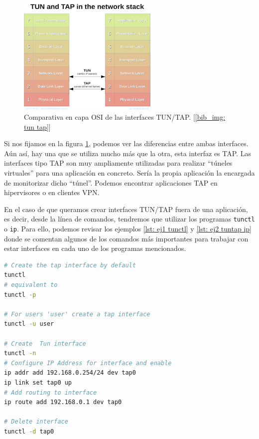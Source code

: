 \documentclass[12pt]{article}
\begin{document}
	\begin{figure}[h!]
		\begin{center}
			\includegraphics[width=0.6\textwidth]{img/tun_vs_tap.png}
			\caption{Comparativa en capa OSI de las interfaces TUN/TAP. [\ref{bib_img: tun tap}]}
			\label{img: tun vs tap}
		\end{center}
	\end{figure}
	
	\noindent Si nos fijamos en la figura \ref{img: tun vs tap}, podemos ver las diferencias entre ambas interfaces. Aún así, hay una que se utiliza mucho más que la otra, esta interfaz es TAP. Las interfaces tipo TAP son muy ampliamente utilizadas para realizar ``túneles virtuales'' para una aplicación en concreto. Sería la propia aplicación la encargada de monitorizar dicho ``túnel''. Podemos encontrar aplicaciones TAP en hipervisores o en clientes VPN.
	
	\pagebreak
	
	\noindent En el caso de que queramos crear interfaces TUN/TAP fuera de una aplicación, es decir, desde la línea de comandos, tendremos que utilizar los programas \texttt{tunctl} o \texttt{ip}. Para ello, podemos revisar los ejemplos \ref{lst: ej1 tunctl} y \ref{lst: ej2 tuntap ip} donde se comentan algunos de los comandos más importantes para trabajar con estar interfaces en cada uno de los programas mencionados.
	
	\vspace{10px}
	
	\begin{lstlisting}[language=Bash, label=lst: ej1 tunctl, caption=Ejemplo de uso de \texttt{tunctl} para controlar interfaces TUN/TAP (\ref{bib: tunctl + ip})]
# Create the tap interface by default
tunctl 
# equivalent to
tunctl -p

# For users 'user' create a tap interface
tunctl -u user

# Create  Tun interface
tunctl -n
# Configure IP Address for interface and enable
ip addr add 192.168.0.254/24 dev tap0
ip link set tap0 up
# Add routing to interface
ip route add 192.168.0.1 dev tap0

# Delete interface
tunctl -d tap0
	\end{lstlisting}
\end{document}
